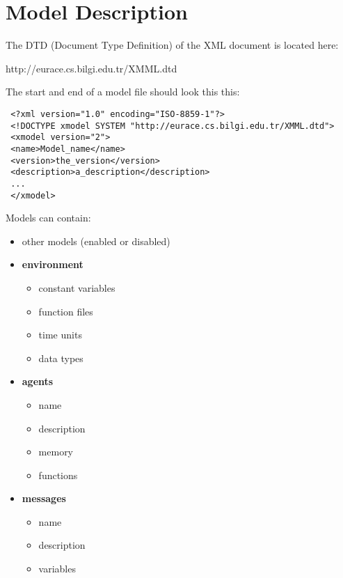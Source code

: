 \section{Model Description}

The DTD (Document Type Definition) of the XML document is located here:

http://eurace.cs.bilgi.edu.tr/XMML.dtd

The start and end of a model file should look this this:

\begin{mylisting}
\begin{verbatim}
 <?xml version="1.0" encoding="ISO-8859-1"?>
 <!DOCTYPE xmodel SYSTEM "http://eurace.cs.bilgi.edu.tr/XMML.dtd">
 <xmodel version="2">
 <name>Model_name</name>
 <version>the_version</version>
 <description>a_description</description>
 ...
 </xmodel>
\end{verbatim}
\end{mylisting}

Models can contain:
\begin{itemize}
\item other models (enabled or disabled)
\item \textbf{environment}
\begin{itemize}
\item constant variables
\item function files
\item time units
\item data types
\end{itemize}
\item \textbf{agents}
\begin{itemize}
\item name
\item description
\item memory
\item functions
\end{itemize}
\item \textbf{messages}
\begin{itemize}
\item name
\item description
\item variables
\end{itemize}
\end{itemize}

